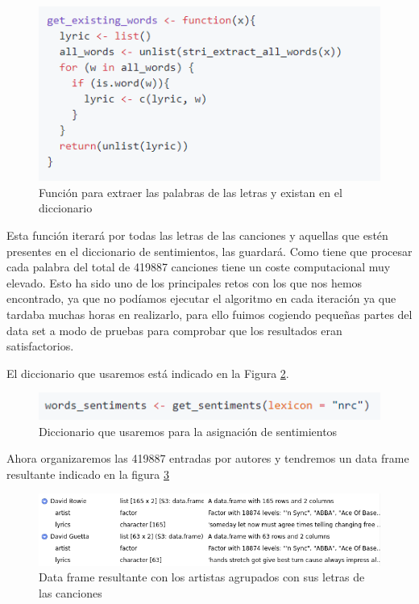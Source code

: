 \begin{figure}[h]
	\centering
	\includegraphics[width=0.7\linewidth]{Imagenes/get_existing_words}
	\caption{Función para extraer las palabras de las letras y existan en el diccionario }
	\label{fig:get_existing_words}
\end{figure}

Esta función iterará por todas las letras de las canciones y aquellas que estén presentes en el diccionario de sentimientos, las guardará. Como tiene que procesar cada palabra del total de 419887 canciones tiene un coste computacional muy elevado. Esto ha sido uno de los principales retos con los que nos hemos encontrado, ya que no podíamos ejecutar el algoritmo en cada iteración ya que tardaba muchas horas en realizarlo, para ello fuimos cogiendo pequeñas partes del data set a modo de pruebas para comprobar que los resultados eran satisfactorios.

El diccionario que usaremos está indicado en la Figura \ref{fig:word_sentiments}.


\begin{figure}[h]
	\centering
	\includegraphics[width=0.7\linewidth]{Imagenes/word_sentiments}
	\caption{Diccionario que usaremos para la asignación de sentimientos}
	\label{fig:word_sentiments}
\end{figure}

 Ahora organizaremos las 419887 entradas por autores y tendremos un data frame resultante indicado en la figura \ref{fig:artistlyrics-dataframe}

\begin{figure}[h]
	\centering
	\includegraphics[width=0.9\linewidth]{Imagenes/artistlyrics-dataframe}
	\caption{Data frame resultante con los artistas agrupados con sus letras de las canciones}
	\label{fig:artistlyrics-dataframe}
\end{figure}

